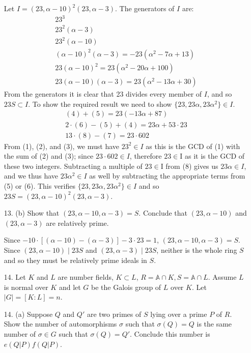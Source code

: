 \documentclass{article}
\newcommand{\ringofintegers}[1]{\mathbb{A} \cap #1}
\begin{document}
\begin{enumerate}
Let $I = (23, \alpha - 10)^2 (23, \alpha - 3)$.  The generators of $I$ are:\setcounter{equation}{0}\begin{gather}23^3 \\ 23^2 (\alpha -3) \\ 23^2 (\alpha - 10)\\ (\alpha - 10)^2 (\alpha - 3) = -23 (\alpha^2 - 7\alpha + 13) \\ 23 (\alpha - 10)^2 = 23(\alpha^2 - 20\alpha + 100) \\ 23(\alpha - 10)(\alpha - 3) = 23(\alpha^2 - 13\alpha + 30) \end{gather}
From the generators it is clear that 23 divides every member of $I$, and so $23S \subset I$. To show the required result we need to show $\{23, 23\alpha, 23 \alpha^2\} \in I$.
\begin{gather} (4) + (5) = 23(-13\alpha + 87) \\
    2 \cdot (6) - (5) + (4) = 23\alpha + 53 \cdot 23\\
    13 \cdot (8) - (7) = 23 \cdot 602
\end{gather}
From (1), (2), and (3), we must have $23^2 \in I$ as this is the GCD of (1) with the sum of (2) and (3); since $23 \cdot 602 \in I$, therefore $23 \in $I as it is the GCD of these two integers.  Subtracting a multiple of $23 \in $I from (8) gives us $23\alpha \in I$, and we thus have $23\alpha^2 \in I$ as well by subtracting the appropriate terms from (5) or (6).  This verifies $\{23, 23\alpha, 23\alpha^2\} \in I$ and so $23S = (23, \alpha - 10)^2 (23, \alpha - 3)$.

\item [13. (b)] Show that $(23, \alpha - 10, \alpha - 3) = S$.  Conclude that $(23, \alpha - 10)$ and $(23, \alpha - 3)$ are relatively prime.

Since $-10 \cdot [(\alpha - 10) - (\alpha - 3)] - 3 \cdot 23 = 1$, $(23, \alpha - 10, \alpha - 3) = S$.  Since $(23, \alpha -10) \mid 23S$ and $(23, \alpha -3) \mid 23S$, neither is the whole ring $S$ and so they must be relatively prime ideals in $S$.

\item[14.] Let $K$ and $L$ are number fields, $K \subset L$, $R = \ringofintegers{K}, S = \ringofintegers{L}$.  Assume $L$ is normal over $K$ and let $G$ be the Galois group of $L$ over $K$.  Let $|G| = [K : L] = n$.

\item[14. (a)] Suppose $Q$ and $Q'$ are two primes of $S$ lying over a prime $P$ of $R$.  Show the number of automorphisms $\sigma$ such that $\sigma(Q) = Q$ is the same number of $\sigma \in G$ such that $\sigma(Q) = Q'$.  Conclude this number is $e(Q|P)f(Q|P)$.


\end{enumerate}
\end{document}
